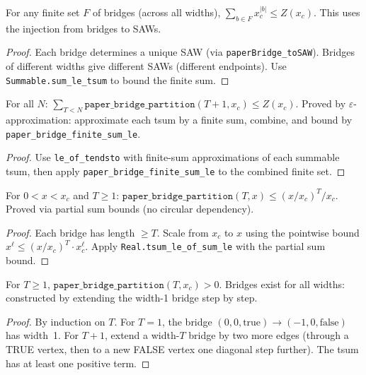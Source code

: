 \begin{lemma}\label{lem:paper_bridge_finite_sum}
\leanok
{}
  For any finite set $F$ of bridges (across all widths),
  $\sum_{b \in F} x_c^{|b|} \leq Z(x_c)$.
  This uses the injection from bridges to SAWs.
\end{lemma}
\begin{proof}
\leanok
  Each bridge determines a unique SAW (via \texttt{paperBridge\_toSAW}).
  Bridges of different widths give different SAWs (different endpoints).
  Use \texttt{Summable.sum\_le\_tsum} to bound the finite sum.
\end{proof}

\begin{lemma}\label{lem:paper_bridge_sum_le_Z}
\leanok
{}
  For all $N$:
  $\sum_{T < N} \texttt{paper\_bridge\_partition}(T{+}1, x_c) \leq Z(x_c)$.
  Proved by $\varepsilon$-approximation: approximate each tsum by a finite
  sum, combine, and bound by \texttt{paper\_bridge\_finite\_sum\_le}.
\end{lemma}
\begin{proof}
\leanok
  Use \texttt{le\_of\_tendsto} with finite-sum approximations
  of each summable tsum, then apply
  \texttt{paper\_bridge\_finite\_sum\_le} to the combined finite set.
\end{proof}

\begin{theorem}\label{thm:paper_bridge_decay}
  For $0 < x < x_c$ and $T \geq 1$:
  $\texttt{paper\_bridge\_partition}(T, x) \leq (x/x_c)^T / x_c$.
  Proved via partial sum bounds (no circular dependency).
\end{theorem}
\begin{proof}
  Each bridge has length $\geq T$. Scale from $x_c$ to $x$
  using the pointwise bound $x^{\ell} \leq (x/x_c)^T \cdot x_c^{\ell}$.
  Apply \texttt{Real.tsum\_le\_of\_sum\_le} with the partial sum bound.
\end{proof}

\begin{lemma}\label{lem:paper_bridge_pos}
\leanok
{}
  For $T \geq 1$, $\texttt{paper\_bridge\_partition}(T, x_c) > 0$.
  Bridges exist for all widths: constructed by extending the width-1 bridge
  step by step.
\end{lemma}
\begin{proof}
\leanok
  By induction on $T$. For $T = 1$, the bridge
  $(0,0,\text{true}) \to (-1,0,\text{false})$ has width~1.
  For $T+1$, extend a width-$T$ bridge by two more edges
  (through a TRUE vertex, then to a new FALSE vertex one diagonal
  step further). The tsum has at least one positive term.
\end{proof}

